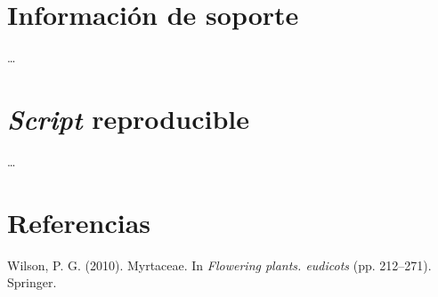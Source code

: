 \documentclass[11pt,]{article}
\begin{document}
\section{Información de soporte}\label{informaciuxf3n-de-soporte}

\ldots

\section{\texorpdfstring{\emph{Script}
reproducible}{Script reproducible}}\label{script-reproducible}

\ldots

\section*{Referencias}\label{referencias}

\hypertarget{refs}{}
\hypertarget{ref-wilson2010myrtaceae}{}
Wilson, P. G. (2010). Myrtaceae. In \emph{Flowering plants. eudicots}
(pp. 212--271). Springer.




\newpage
\singlespacing 
\end{document}
